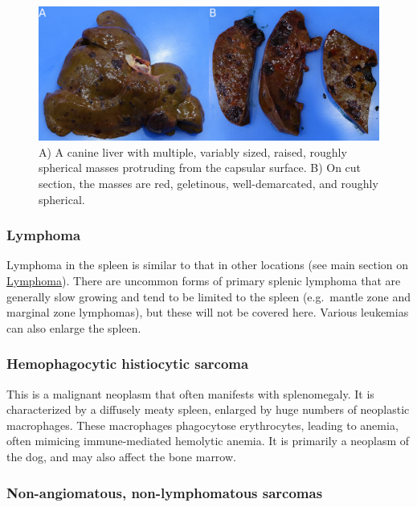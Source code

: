 \documentclass[openany]{article}
\begin{document}
\begin{figure}

{\centering \includegraphics[width=1\linewidth]{images/liver-comp} 

}

\caption{A) A canine liver with multiple, variably sized, raised, roughly spherical masses protruding from the capsular surface. B) On cut section, the masses are red, geletinous, well-demarcated, and roughly spherical.}\label{fig:hemangio-met}
\end{figure}

\hypertarget{lymphoma}{\subsubsection{Lymphoma}\label{lymphoma}}

Lymphoma in the spleen is similar to that in other locations (see main
section on \protect\hyperlink{lymphoma}{Lymphoma}). There are uncommon
forms of primary splenic lymphoma that are generally slow growing and
tend to be limited to the spleen (e.g.~mantle zone and marginal zone
lymphomas), but these will not be covered here. Various leukemias can
also enlarge the spleen.

\subsubsection{Hemophagocytic histiocytic
sarcoma}\label{hemophagocytic-histiocytic-sarcoma}

This is a malignant neoplasm that often manifests with splenomegaly. It
is characterized by a diffusely meaty spleen, enlarged by huge numbers
of neoplastic macrophages. These macrophages phagocytose erythrocytes,
leading to anemia, often mimicing immune-mediated hemolytic anemia. It
is primarily a neoplasm of the dog, and may also affect the bone marrow.

\subsubsection{Non-angiomatous, non-lymphomatous
sarcomas}\label{non-angiomatous-non-lymphomatous-sarcomas}
\end{document}
